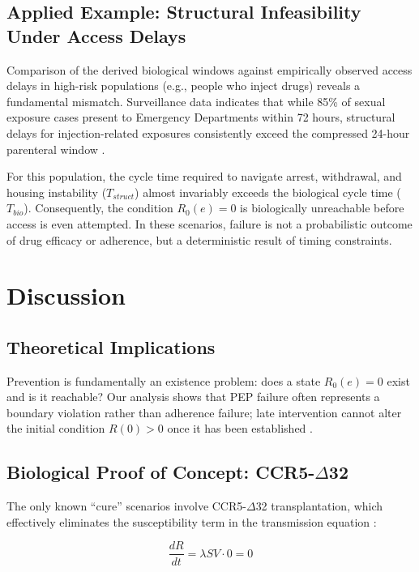 \documentclass[12pt]{article}
\begin{document}
\subsection{Applied Example: Structural Infeasibility Under Access Delays}

Comparison of the derived biological windows against empirically observed access delays in high-risk populations (e.g., people who inject drugs) reveals a fundamental mismatch. Surveillance data indicates that while 85\% of sexual exposure cases present to Emergency Departments within 72 hours, structural delays for injection-related exposures consistently exceed the compressed 24-hour parenteral window \cite{taylor_stuck_2019, baugher_ending_2025}.

For this population, the cycle time required to navigate arrest, withdrawal, and housing instability ($T_{struct}$) almost invariably exceeds the biological cycle time ($T_{bio}$). Consequently, the condition $R_0(e)=0$ is biologically unreachable before access is even attempted. In these scenarios, failure is not a probabilistic outcome of drug efficacy or adherence, but a deterministic result of timing constraints.

\section{Discussion}

\subsection{Theoretical Implications}

Prevention is fundamentally an existence problem: does a state $R_0(e)=0$ exist and is it reachable? Our analysis shows that PEP failure often represents a boundary violation rather than adherence failure; late intervention cannot alter the initial condition $R(0)>0$ once it has been established \cite{grant_evidence_1987}.

\subsection{Biological Proof of Concept: CCR5-$\Delta$32}

The only known ``cure'' scenarios involve CCR5-$\Delta$32 transplantation, which effectively eliminates the susceptibility term in the transmission equation \cite{hutter_long-term_2009}:

\begin{equation}
\frac{dR}{dt} = \lambda S V \cdot 0 = 0
\end{equation}
\end{document}
